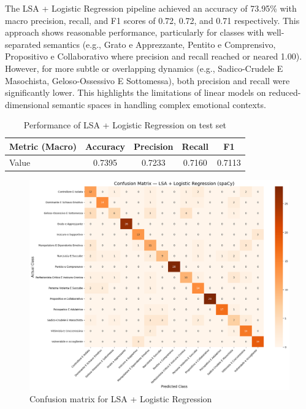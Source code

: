 \documentclass[conference]{IEEEtran}
\begin{document}
The LSA + Logistic Regression pipeline achieved an accuracy of 73.95\% with macro precision, recall, and F1 scores of 0.72, 0.72, and 0.71 respectively. This approach shows reasonable performance, particularly for classes with well-separated semantics (e.g., Grato e Apprezzante, Pentito e Comprensivo, Propositivo e Collaborativo where precision and recall reached or neared 1.00). However, for more subtle or overlapping dynamics (e.g., Sadico-Crudele E Masochista, Geloso-Ossessivo E Sottomessa), both precision and recall were significantly lower. This highlights the limitations of linear models on reduced-dimensional semantic spaces in handling complex emotional contexts.

\begin{table}[H]
  \centering
  \begin{tabular}{lcccc}
    \toprule
    \textbf{Metric (Macro)} & \textbf{Accuracy} & \textbf{Precision} & \textbf{Recall} & \textbf{F1} \\
    \midrule
    Value & 0.7395 & 0.7233 & 0.7160 & 0.7113 \\
    \bottomrule
  \end{tabular}
  \caption{Performance of LSA + Logistic Regression on test set}
\end{table}

\begin{figure}[H]
  \centering
  \includegraphics[width=\columnwidth]{figures/lsa_logreg_confusion_matrix.png}
  \caption{Confusion matrix for LSA + Logistic Regression}
\end{figure}
\end{document}
